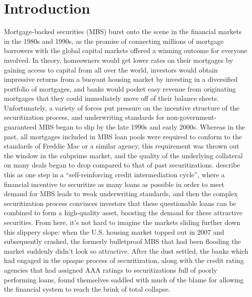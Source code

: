 \documentclass[12pt]{article}
\begin{document}
\section*{Introduction}
Mortgage-backed securities (MBS) burst onto the scene in the financial markets in the 1980s and 1990s, as the promise of connecting millions of mortgage borrowers with the global capital markets offered a winning outcome for everyone involved. In theory, homeowners would get lower rates on their mortgages by gaining access to capital from all over the world, investors would obtain impressive returns from a buoyant housing market by investing in a diversified portfolio of mortgages, and banks would pocket easy revenue from originating mortgages that they could immediately move off of their balance sheets. Unfortunately, a variety of forces put pressure on the incentive structure of the securitization process, and underwriting standards for non-government-guaranteed MBS began to slip by the late 1990s and early 2000s. Whereas in the past, all mortgages included in MBS loan pools were required to conform to the standards of Freddie Mac or a similar agency, this requirement was thrown out the window in the subprime market, and the quality of the underlying collateral on many deals began to drop compared to that of past securitizations. \textcite{segoviano13} describe this as one step in a “self-reinforcing credit intermediation cycle”, where a financial incentive to securitize as many loans as possible in order to meet demand for MBS leads to weak underwriting standards, and then the complex securitization process convinces investors that these questionable loans can be combined to form a high-quality asset, boosting the demand for these attractive securities. From here, it’s not hard to imagine the markets sliding further down this slippery slope: when the U.S. housing market topped out in 2007 and subsequently crashed, the formerly bulletproof MBS that had been flooding the market suddenly didn’t look so attractive. After the dust settled, the banks which had engaged in the opaque process of securitization, along with the credit rating agencies that had assigned AAA ratings to securitizations full of poorly performing loans, found themselves saddled with much of the blame for allowing the financial system to reach the brink of total collapse.
\end{document}
